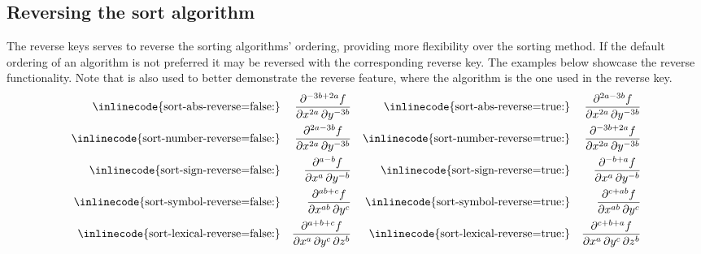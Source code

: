 \subsection{Reversing the sort algorithm} \label{ssec:sort-reverse}
The reverse keys serves to reverse the sorting algorithms' ordering, providing more flexibility over the sorting method. If the default ordering of an algorithm is not preferred it may be reversed with the corresponding reverse key. The examples below showcase the reverse functionality. Note that  is also used to better demonstrate the reverse feature, where the algorithm is the one used in the reverse key.
\begin{align*}
	\text{\inlinecode{sort-abs-reverse=false:}}     && \pdv[sort-method={abs}, sort-abs-reverse=false, order={2a, -3b}]{f}{x,y}       &&
	\text{\inlinecode{sort-abs-reverse=true:}}      && \pdv[sort-method={abs}, sort-abs-reverse=true, order={2a, -3b}]{f}{x,y}        \\
	\text{\inlinecode{sort-number-reverse=false:}}  && \pdv[sort-method={number}, sort-number-reverse=false, order={2a, -3b}]{f}{x,y} &&
	\text{\inlinecode{sort-number-reverse=true:}}   && \pdv[sort-method={number}, sort-number-reverse=true, order={2a, -3b}]{f}{x,y}  \\
	\text{\inlinecode{sort-sign-reverse=false:}}    && \pdv[sort-method={sign}, sort-sign-reverse=false, order={a, -b}]{f}{x,y}       &&
	\text{\inlinecode{sort-sign-reverse=true:}}     && \pdv[sort-method={sign}, sort-sign-reverse=true, order={a, -b}]{f}{x,y}        \\
	\text{\inlinecode{sort-symbol-reverse=false:}}  && \pdv[sort-method={symbol}, sort-symbol-reverse=false, order={ab, c}]{f}{x,y}   &&
	\text{\inlinecode{sort-symbol-reverse=true:}}   && \pdv[sort-method={symbol}, sort-symbol-reverse=true, order={ab, c}]{f}{x,y}    \\
	\text{\inlinecode{sort-lexical-reverse=false:}} && \pdv[sort-method={lexical}, sort-lexical-reverse=false, order={a, c, b}]{f}{x,y,z}  &&
	\text{\inlinecode{sort-lexical-reverse=true:}}  && \pdv[sort-method={lexical}, sort-lexical-reverse=true, order={a, c, b}]{f}{x,y,z}   \\
\end{align*}



